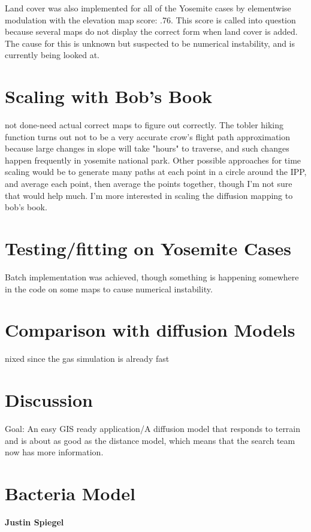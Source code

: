 \documentclass[]{article}
\begin{document}
Land cover was also implemented for all of the Yosemite cases by elementwise modulation with the elevation map score: .76.  This score is called into question because several maps do not display the correct form when land cover is added. The cause for this is unknown but suspected to be numerical instability, and is currently being looked at.
\section{Scaling with Bob's Book}
not done-need actual correct maps to figure out correctly.
The tobler hiking function turns out not to be a very accurate crow's flight path approximation because large changes in slope will take "hours" to traverse, and such changes happen frequently in yosemite national park.  Other possible approaches for time scaling would be to generate many paths at each point in a circle around the IPP, and average each point, then average the points together, though I'm not sure that would help much. I'm more interested in scaling the diffusion mapping to bob's book.
\section{Testing/fitting on Yosemite Cases}
Batch implementation was achieved, though something is happening somewhere in the code on some maps to cause numerical instability.

\section{Comparison with diffusion Models}
nixed since the gas simulation is already fast
\section{Discussion}
Goal: An easy GIS ready application/A diffusion model that responds to terrain and is about as good as the distance model, which means that the search team now has more information.


\section{Bacteria Model}
\textbf{Justin Spiegel}
\end{document}
